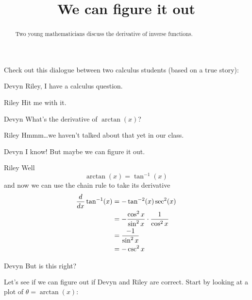 \documentclass{ximera}
\title[Break-Ground:]{We can figure it out}
\begin{document}
\begin{abstract}
Two young mathematicians discuss the derivative of inverse functions.
\end{abstract}
\maketitle

Check out this dialogue between two calculus students (based on a true
story):

\begin{dialogue}
\item[Devyn] Riley, I have a calculus question.
\item[Riley] Hit me with it.
\item[Devyn] What's the derivative of $\arctan(x)$?
\item[Riley] Hmmm\dots we haven't talked about that yet in our class.
\item[Devyn] I know! But maybe we can figure it out.
\item[Riley] Well
  \[
  \arctan(x) = \tan^{-1}(x)
  \]
  and now we can use the chain rule to take its derivative
  \begin{align*}
    \frac{d}{dx} \tan^{-1}(x) &= -\tan^{-2}(x)\sec^2(x)\\
    &= -\frac{\cos^2x}{\sin^2x}\cdot \frac{1}{\cos^2x}\\
    &= \frac{-1}{\sin^2x}\\
    &= -\csc^2x
  \end{align*}
\item[Devyn] But is this right?
\end{dialogue}

Let's see if we can figure out if Devyn and Riley are correct. Start by looking at a plot of $\theta = \arctan(x)$:
\end{document}
